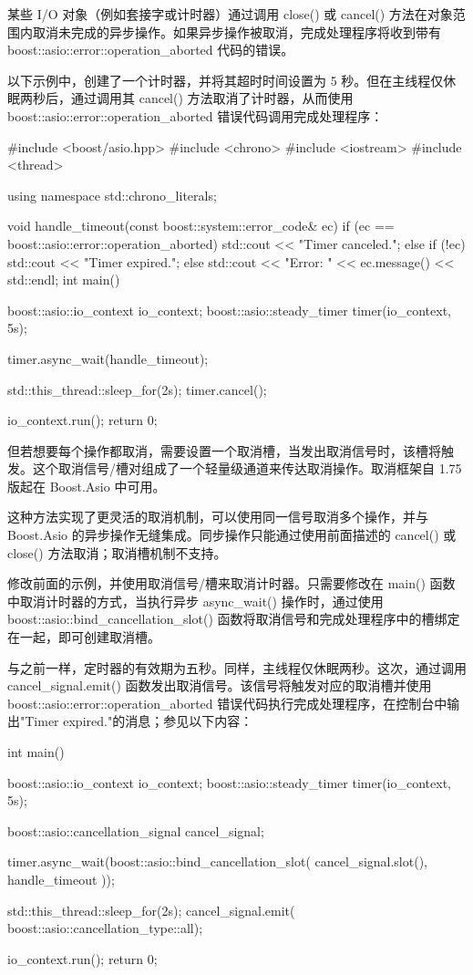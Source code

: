 
某些 I/O 对象（例如套接字或计时器）通过调用 close() 或 cancel() 方法在对象范围内取消未完成的异步操作。如果异步操作被取消，完成处理程序将收到带有 boost::asio::error::operation\_aborted 代码的错误。

以下示例中，创建了一个计时器，并将其超时时间设置为 5 秒。但在主线程仅休眠两秒后，通过调用其 cancel() 方法取消了计时器，从而使用 boost::asio::error::operation\_aborted 错误代码调用完成处理程序：

\begin{cpp}
#include <boost/asio.hpp>
#include <chrono>
#include <iostream>
#include <thread>

using namespace std::chrono_literals;

void handle_timeout(const boost::system::error_code& ec) {
    if (ec == boost::asio::error::operation_aborted) {
        std::cout << "Timer canceled.\n";
    } else if (!ec) {
        std::cout << "Timer expired.\n";
    } else {
        std::cout << "Error: " << ec.message()
                  << std::endl;
    }
}
int main() {
    boost::asio::io_context io_context;
    boost::asio::steady_timer timer(io_context, 5s);

    timer.async_wait(handle_timeout);

    std::this_thread::sleep_for(2s);
    timer.cancel();

    io_context.run();
    return 0;
}
\end{cpp}

但若想要每个操作都取消，需要设置一个取消槽，当发出取消信号时，该槽将触发。这个取消信号/槽对组成了一个轻量级通道来传达取消操作。取消框架自 1.75 版起在 Boost.Asio 中可用。

这种方法实现了更灵活的取消机制，可以使用同一信号取消多个操作，并与 Boost.Asio 的异步操作无缝集成。同步操作只能通过使用前面描述的 cancel() 或 close() 方法取消；取消槽机制不支持。

修改前面的示例，并使用取消信号/槽来取消计时器。只需要修改在 main() 函数中取消计时器的方式，当执行异步 async\_wait() 操作时，通过使用 boost::asio::bind\_cancellation\_slot() 函数将取消信号和完成处理程序中的槽绑定在一起，即可创建取消槽。

与之前一样，定时器的有效期为五秒。同样，主线程仅休眠两秒。这次，通过调用 cancel\_signal.emit() 函数发出取消信号。该信号将触发对应的取消槽并使用 boost::asio::error::operation\_aborted 错误代码执行完成处理程序，在控制台中输出"Timer expired."的消息；参见以下内容：

\begin{cpp}
int main() {
    boost::asio::io_context io_context;
    boost::asio::steady_timer timer(io_context, 5s);

    boost::asio::cancellation_signal cancel_signal;

    timer.async_wait(boost::asio::bind_cancellation_slot(
        cancel_signal.slot(),
        handle_timeout
    ));

    std::this_thread::sleep_for(2s);
    cancel_signal.emit(
        boost::asio::cancellation_type::all);

    io_context.run();
    return 0;
}
\end{cpp}

